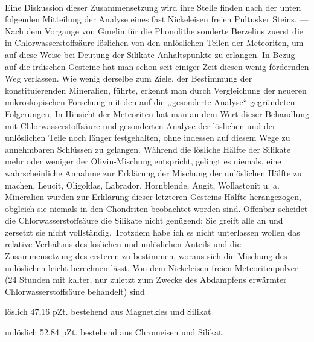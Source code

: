 \documentclass[a4paper, 11pt, oneside, german]{article}
\begin{document}
\paragraph{}
Eine Diskussion dieser Zusammensetzung wird ihre Stelle finden nach der unten folgenden Mitteilung der Analyse eines fast Nickeleisen freien Pultusker Steins. --- Nach dem Vorgange von Gmelin für die Phonolithe sonderte Berzelius zuerst die in Chlorwasserstoffsäure löslichen von den unlöslichen Teilen der Meteoriten, um auf diese Weise bei Deutung der Silikate Anhaltspunkte zu erlangen. In Bezug auf die irdischen Gesteine hat man schon seit einiger Zeit diesen wenig fördernden Weg verlassen. Wie wenig derselbe zum Ziele, der Bestimmung der konstituierenden Mineralien, führte, erkennt man durch Vergleichung der neueren mikroskopischen Forschung mit den auf die „gesonderte Analyse“ gegründeten Folgerungen. In Hinsicht der Meteoriten hat man an dem Wert dieser Behandlung mit Chlorwasserstoffsäure und gesonderten Analyse der löslichen und der unlöslichen Teile noch länger festgehalten, ohne indessen auf diesem Wege zu annehmbaren Schlüssen zu gelangen. Während die lösliche Hälfte der Silikate mehr oder weniger der Olivin-Mischung entspricht, gelingt es niemals, eine wahrscheinliche Annahme zur Erklärung der Mischung der unlöslichen Hälfte zu machen. Leucit, Oligoklas, Labrador, Hornblende, Augit, Wollastonit u. a. Mineralien wurden zur Erklärung dieser letzteren Gesteins-Hälfte herangezogen, obgleich sie niemals in den Chondriten beobachtet worden sind. Offenbar scheidet die Chlorwasserstoffsäure die Silikate nicht genügend: Sie greift alle an und zersetzt sie nicht vollständig. Trotzdem habe ich es nicht unterlassen wollen das relative Verhältnis des löslichen und unlöslichen Anteils und die Zusammensetzung des ersteren zu bestimmen, woraus sich die Mischung des unlöslichen leicht berechnen lässt. Von dem Nickeleisen-freien Meteoritenpulver (24 Stunden mit kalter, nur zuletzt zum Zwecke des Abdampfens erwärmter Chlorwasserstoffsäure behandelt) sind
\begin{center}
löslich 47,16 pZt. bestehend aus Magnetkies und Silikat

unlöslich 52,84 pZt. bestehend aus Chromeisen und Silikat.
\end{center}
\end{document}
